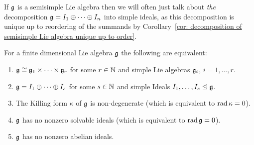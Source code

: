 \begin{rem}
 If $\mathfrak{g}$ is a semisimple Lie algebra then we will often just talk about \emph{the} decomposition $\mathfrak{g} = I_1 \oplus \dotsb \oplus I_n$ into simple ideals, as this decomposition is unique up to reordering of the summands by Corollary~\ref{cor: decomposition of semisimple Lie algebra unique up to order}.
\end{rem}


\begin{thrm}\label{thrm: characterisations of finite-dimensional semisimple Lie algebras}
 For a finite dimensional Lie algebra $\mathfrak{g}$ the following are equivalent:
 \begin{enumerate}[leftmargin=*]
  \item\label{enum: definition semisimple Lie algebra product of simple Lie algebras}
   $\mathfrak{g} \cong \mathfrak{g}_1 \times \dotsb \times \mathfrak{g}_r$ for some $r \in \mathbb{N}$ and simple Lie algebras $\mathfrak{g}_i$, $i = 1, \dotsc, r$.
  \item\label{enum: definition semisimple Lie algebra sum of simple ideals}
   $\mathfrak{g} = I_1 \oplus \dotsb \oplus I_s$ for some $s \in \mathbb{N}$ and simple Ideals $I_1, \dotsc, I_s \trianglelefteq \mathfrak{g}$.
  \item\label{enum: definition semisimple Lie algebra killing form nondegenerate}
   The Killing form $\kappa$ of $\mathfrak{g}$ is non-degenerate (which is equivalent to $\operatorname{rad} \kappa = 0$).
  \item\label{enum: definition semisimple Lie algebra radical is zero}
   $\mathfrak{g}$ has no nonzero solvable ideals (which is equivalent to $\operatorname{rad} \mathfrak{g} = 0$).
  \item\label{enum: definition semisimple Lie algebra no nonzero abelian ideals}
   $\mathfrak{g}$ has no nonzero abelian ideals.
 \end{enumerate}
\end{thrm}
